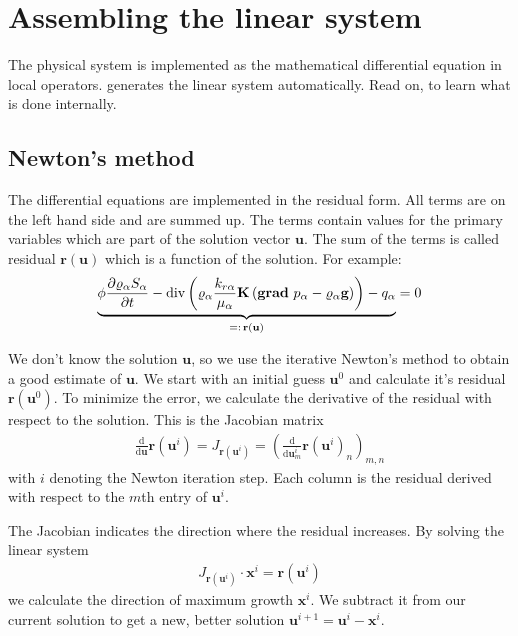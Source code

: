 \section{Assembling the linear system}
\label{sc_linearsystem}
The physical system is implemented as the mathematical differential equation in
local operators. \Dumux generates the linear system automatically. Read on, to
learn what is done internally.

\subsection{Newton's method}
The differential equations are implemented in the residual form. All terms are
on the left hand side and are summed up. The terms contain values for the primary
variables which are part of the solution vector $\textbf{u}$. The sum of the terms
is called residual $\textbf{r}(\textbf{u})$ which is a function of the solution. For
example:
\begin{align*}
\underbrace{
  \phi \frac{\partial \varrho_\alpha S_\alpha}{\partial t}
 -
 \text{div} \left(
 \varrho_\alpha \frac{k_{r\alpha}}{\mu_\alpha} \mbox{\bf K}
 \left(\operatorname{\bf grad}\, p_\alpha - \varrho_{\alpha} \mbox{\bf g} \right)
 \right) - q_\alpha} _
{=: \, \textbf{r}(\textbf{u})}
= 0
\end{align*}

We don't know the solution $\textbf{u}$, so we use the iterative Newton's method to
obtain a good estimate of $\textbf{u}$. We start with an initial guess $\textbf{u}^0$ and
calculate it's residual $\textbf{r}(\textbf{u}^0)$. To minimize the error, we calculate
the derivative of the residual with respect to the solution. This is the Jacobian
matrix
\begin{align*}
  \frac{\text{d}}{\text{d}\textbf{u}}\textbf{r} \left(\textbf{u}^i\right)
  = J_{\textbf{r} \left(\textbf{u}^i\right)}
  = \left(\frac{\text{d}}{\text{d}\textbf{u}^i_m}\textbf{r} \left(\textbf{u}^i\right)_n\right)_{m,n}
\end{align*}
with $i$ denoting the Newton iteration step.
Each column is the residual derived with respect to the $m$th entry of $\textbf{u}^i$.

The Jacobian indicates the direction where the residual increases. By solving the
linear system
\begin{align*}
  J_{\textbf{r}(\textbf{u}^i)} \cdot \textbf{x}^i = \textbf{r}(\textbf{u}^i)
\end{align*}
we calculate the direction of maximum growth $\textbf{x}^i$. We subtract it from
our current solution to get a new, better solution
$\textbf{u}^{i+1} = \textbf{u}^i - \textbf{x}^i$.

